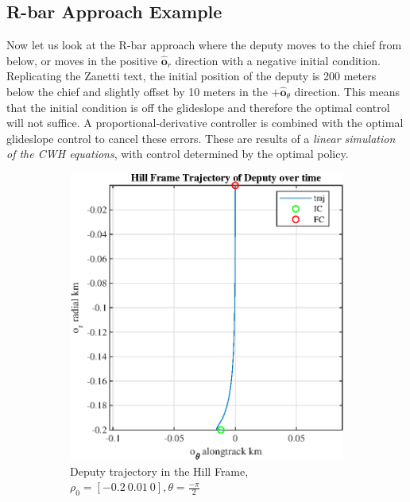 \documentclass[conf]{new-aiaa}
\begin{document}
\begin{singlespace}
\subsection{R-bar Approach Example}
Now let us look at the R-bar approach where the deputy moves to the chief from below, or moves in the positive $\bm{\hat{o}}_r$ direction with a negative initial condition. Replicating the Zanetti text, the initial position of the deputy is 200 meters below the chief and slightly offset by 10 meters in the $+\bm{\hat{o}}_\theta$ direction. This means that the initial condition is off the glideslope and therefore the optimal control will not suffice. A proportional-derivative controller is combined with the optimal glideslope control to cancel these errors. These are results of a \textit{linear simulation of the CWH equations}, with control determined by the optimal policy.
%
%
\begin{figure}[htpb!]
\begin{subfigure}{.5\textwidth}
  \centering
  \includegraphics[width=.8\linewidth]{figures/traj_R.eps}
  \caption{Deputy trajectory in the Hill Frame, $\rho_0 = [-0.2  \ 0.01 \ 0], \theta=\frac{-\pi}{2} $}
  \label{fig:traj_r}
\end{subfigure}%
\begin{subfigure}{.5\textwidth}
  \centering

\end{subfigure}
\end{figure}
\end{singlespace}
\end{document}
